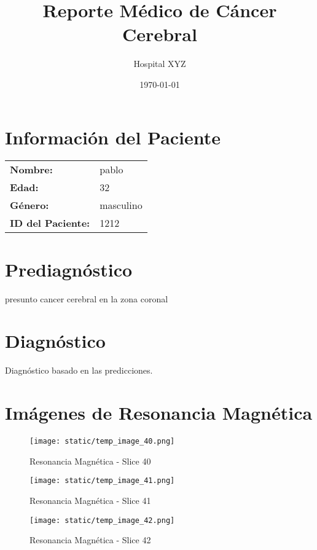 \documentclass[12pt,a4paper]{article}%
\title{Reporte Médico de Cáncer Cerebral}%
\author{Hospital XYZ}%
\date{\today}%
\begin{document}
%
\normalsize%
\maketitle%
\newpage%
\section{Información del Paciente}%
\label{sec:InformacindelPaciente}%
\begin{tabular}{ll}%
\textbf{Nombre:}&pablo\\%
\textbf{Edad:}&32\\%
\textbf{Género:}&masculino\\%
\textbf{ID del Paciente:}&1212\\%
\end{tabular}

%
\section{Prediagnóstico}%
\label{sec:Prediagnstico}%
presunto cancer cerebral en la zona coronal

%
\section{Diagnóstico}%
\label{sec:Diagnstico}%
Diagnóstico basado en las predicciones.

%
\section{Imágenes de Resonancia Magnética}%
\label{sec:ImgenesdeResonanciaMagntica}%


\begin{figure}[H]%
\centering%
\texttt{[image: static/temp\_image\_40.png]}%
\caption{Resonancia Magnética {-} Slice 40}%
\end{figure}

%


\begin{figure}[H]%
\centering%
\texttt{[image: static/temp\_image\_41.png]}%
\caption{Resonancia Magnética {-} Slice 41}%
\end{figure}

%


\begin{figure}[H]%
\centering%
\texttt{[image: static/temp\_image\_42.png]}%
\caption{Resonancia Magnética {-} Slice 42}%
\end{figure}
\end{document}
